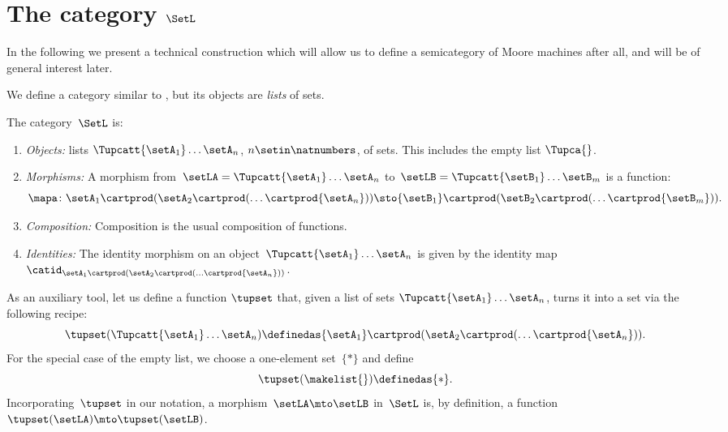 
\section{The category $\SetL$}
\label{sec:SetL}

In the following we present a technical construction which will allow us to define a semicategory of Moore machines after all, and will be of general interest later.

We define a category similar to \Set, but its objects are \emph{lists} of sets.

\begin{definition}
    \label{def:SetL}
    The category~$\SetL$ is:
    \begin{enumerate}
        \item \emph{Objects:} lists $\Tupcatt {\setA_1}  \dots {\setA_n}$, $n \setin \natnumbers$, of sets.
              This includes the empty list $\Tupca {}$.
        \item \emph{Morphisms:}
              A morphism from~$\setLA =\Tupcatt {\setA_1}  \dots {\setA_n}$ to~$\setLB = \Tupcatt {\setB_1} \dots {\setB_m}$ is a function:
              \begin{equation*}
                  \mapa\colon {\setA_1} \cartprod (\setA_2 \cartprod (\ldots \cartprod {\setA_n})) \sto {\setB_1} \cartprod (\setB_2 \cartprod (\ldots \cartprod {\setB_m})).
              \end{equation*}
        \item \emph{Composition:}
              Composition is the usual composition of functions.
        \item \emph{Identities:}
              The identity morphism on an object~$\Tupcatt {\setA_1} \dots {\setA_n}$ is given by the identity map~$\catid_{{\setA_1} \cartprod (\setA_2 \cartprod (\ldots \cartprod {\setA_n}))}$.
    \end{enumerate}
\end{definition}

As an auxiliary tool, let us define a function $\tupset$ that, given a list of sets $\Tupcatt {\setA_1}  \dots {\setA_n}$, turns it into a set via the following recipe:
\begin{equation*}
    \tupset (\Tupcatt {\setA_1}  \dots {\setA_n}) \definedas {\setA_1} \cartprod (\setA_2 \cartprod (\ldots \cartprod {\setA_n})).
\end{equation*}
For the special case of the empty list, we choose a one-element set~$\{*\}$ and define
\begin{equation*}
    \tupset (\makelist{}) \definedas \{*\}.
\end{equation*}
Incorporating~$\tupset$ in our notation, a morphism~$\setLA \mto \setLB$ in~$\SetL$ is, by definition, a function~$\tupset(\setLA) \mto \tupset(\setLB)$.

